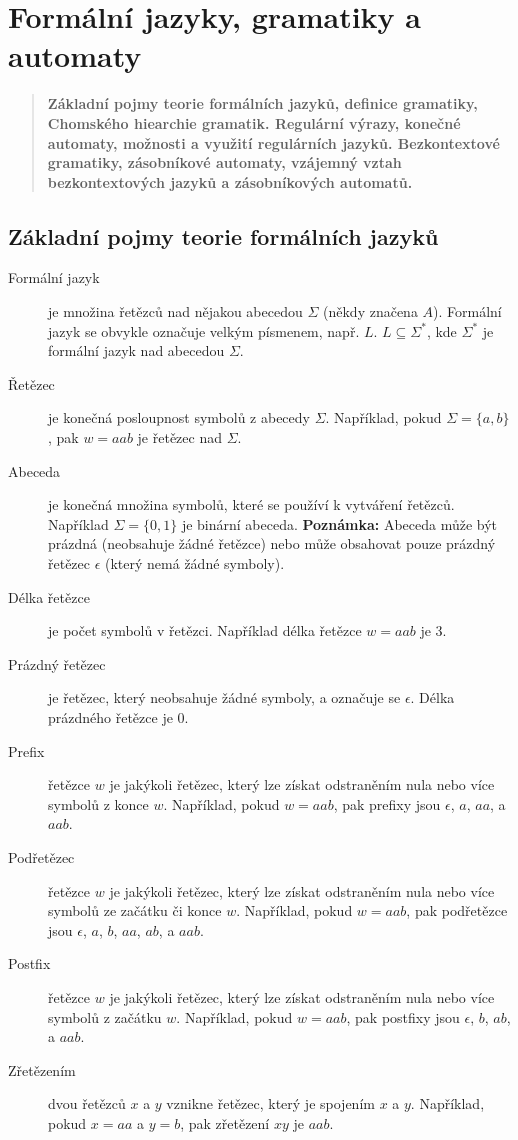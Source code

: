 \section{Formální jazyky, gramatiky a automaty}
\begin{quote}
\textbf{Základní pojmy teorie formálních jazyků, definice gramatiky, Chomského hiearchie gramatik. Regulární výrazy, konečné automaty, možnosti a využití regulárních jazyků. Bezkontextové gramatiky, zásobníkové automaty, vzájemný vztah bezkontextových jazyků a zásobníkových automatů.} 
\end{quote}

\subsection{Základní pojmy teorie formálních jazyků}

\begin{description}
\item[Formální jazyk] je množina řetězců nad nějakou abecedou $\Sigma$ (někdy značena $A$). 
Formální jazyk se obvykle označuje velkým písmenem, např. $L$. $L \subseteq \Sigma^*$, 
kde $\Sigma^*$ je formální jazyk nad abecedou $\Sigma$.
\item[Řetězec] je konečná posloupnost symbolů z abecedy $\Sigma$. Například, pokud $\Sigma = \{a, b\}$, pak $w = aab$ je řetězec nad $\Sigma$.
\item[Abeceda] je konečná množina symbolů, které se používí k vytváření řetězců. Například $\Sigma = \{0, 1\}$ je binární abeceda.
\textbf{Poznámka:} Abeceda může být prázdná (neobsahuje žádné řetězce) nebo může obsahovat pouze prázdný řetězec $\epsilon$ (který nemá žádné symboly).
\item[Délka řetězce] je počet symbolů v řetězci. Například délka řetězce $w = aab$ je 3.
\item[Prázdný řetězec] je řetězec, který neobsahuje žádné symboly, a označuje se $\epsilon$. Délka prázdného řetězce je 0.
\item[Prefix] řetězce $w$ je jakýkoli řetězec, který lze získat odstraněním nula nebo více symbolů z konce $w$. Například, pokud $w = aab$, pak prefixy jsou $\epsilon$, $a$, $aa$, a $aab$.
\item[Podřetězec] řetězce $w$ je jakýkoli řetězec, který lze získat odstraněním nula nebo více symbolů ze začátku či konce $w$. Například, pokud $w = aab$, pak podřetězce jsou $\epsilon$, $a$, $b$, $aa$, $ab$, a $aab$.
\item[Postfix] řetězce $w$ je jakýkoli řetězec, který lze získat odstraněním nula nebo více symbolů z začátku $w$. Například, pokud $w = aab$, pak postfixy jsou $\epsilon$, $b$, $ab$, a $aab$.
\item[Zřetězením] dvou řetězců $x$ a $y$ vznikne řetězec, který je spojením $x$ a $y$. Například, pokud $x = aa$ a $y = b$, pak zřetězení $xy$ je $aab$.
\end{description}

